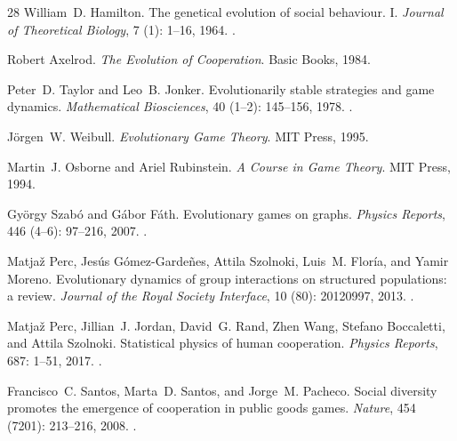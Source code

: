 \documentclass[11pt]{article}
\theoremstyle{plain}
\theoremstyle{definition}
\theoremstyle{remark}
\begin{document}
\begin{thebibliography}{28}
William~D. Hamilton.
\newblock The genetical evolution of social behaviour. {I}.
\newblock \emph{Journal of Theoretical Biology}, 7 (1):
  1--16, 1964.
\newblock {}.

Robert Axelrod.
\newblock \emph{The Evolution of Cooperation}.
\newblock Basic Books, 1984.

Peter~D. Taylor and Leo~B. Jonker.
\newblock Evolutionarily stable strategies and game dynamics.
\newblock \emph{Mathematical Biosciences}, 40 (1--2):
  145--156, 1978.
\newblock {}.

J{\"o}rgen~W. Weibull.
\newblock \emph{Evolutionary Game Theory}.
\newblock MIT Press, 1995.

Martin~J. Osborne and Ariel Rubinstein.
\newblock \emph{A Course in Game Theory}.
\newblock MIT Press, 1994.

Gy{\"o}rgy Szab{\'o} and G{\'a}bor F{\'a}th.
\newblock Evolutionary games on graphs.
\newblock \emph{Physics Reports}, 446 (4--6): 97--216, 2007.
\newblock {}.

Matja{\v z} Perc, Jes{\'u}s G{\'o}mez-Garde{\~n}es, Attila Szolnoki, Luis~M.
  Flor{\'i}a, and Yamir Moreno.
\newblock Evolutionary dynamics of group interactions on structured
  populations: a review.
\newblock \emph{Journal of the Royal Society Interface}, 10
  (80): 20120997, 2013.
\newblock {}.

Matja{\v z} Perc, Jillian~J. Jordan, David~G. Rand, Zhen Wang, Stefano
  Boccaletti, and Attila Szolnoki.
\newblock Statistical physics of human cooperation.
\newblock \emph{Physics Reports}, 687: 1--51, 2017.
\newblock {}.

Francisco~C. Santos, Marta~D. Santos, and Jorge~M. Pacheco.
\newblock Social diversity promotes the emergence of cooperation in public
  goods games.
\newblock \emph{Nature}, 454 (7201): 213--216, 2008.
\newblock {}.


\end{thebibliography}
\end{document}
